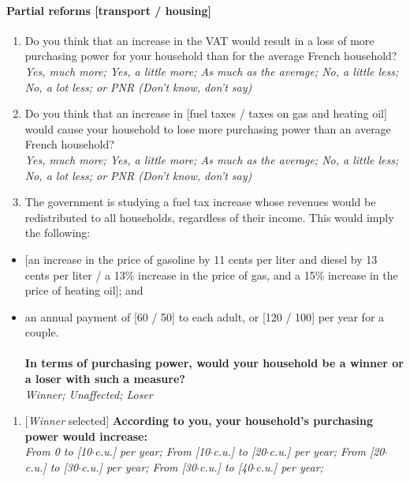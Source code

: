 \documentclass[12pt]{article} %
\begin{document}
\begin{appendices}
\paragraph{Partial reforms {[}transport / housing{]}}
\begin{enumerate}[resume,leftmargin=*]
\item Do you think that an increase in the VAT would result in a loss of more
purchasing power for your household than for the average French household?
\emph{}\\
\emph{Yes, much more; Yes, a little more; As much as the average;
No, a little less; No, a lot less; or PNR (Don't know, don't say)} 
\item Do you think that an increase in {[}fuel taxes / taxes on gas and
heating oil{]} would cause your household to lose more purchasing
power than an average French household? \emph{}\\
\emph{Yes, much more; Yes, a little more; As much as the average;
No, a little less; No, a lot less; or PNR (Don't know, don't say)}
\item The government is studying a fuel tax increase whose revenues would
be redistributed to all households, regardless of their income. This
would imply the following: 
\end{enumerate}
\begin{itemize}
\item {[}an increase in the price of gasoline by 11 cents per liter and
diesel by 13 cents per liter / a 13\% increase in the price of gas,
and a 15\% increase in the price of heating oil{]}; and 
\item an annual payment of {[}60 / 50{]}\euros{} to each adult, or {[}120 / 100{]}\euros{}
per year for a couple. \\
\\
\textbf{In terms of purchasing power, would your household be a winner
or a loser with such a measure?} \emph{}\\
\emph{Winner; Unaffected; Loser} 
\end{itemize}
\begin{enumerate}[resume,leftmargin=*]
\item {[}\emph{Winner} selected{]} \textbf{According to you, your household's
purchasing power would increase:} \emph{}\\
\emph{From 0 to {[}10$\cdot$c.u.{]} \euros{} per year; From {[}10$\cdot$c.u.{]}
to {[}20$\cdot$c.u.{]} \euros{} per year; From {[}20$\cdot$c.u.{]} to {[}30$\cdot$c.u.{]}
\euros{} per year; From {[}30$\cdot$c.u.{]} to {[}40$\cdot$c.u.{]} \euros{} per year;
}
\end{enumerate}
\end{appendices}
\end{document}
